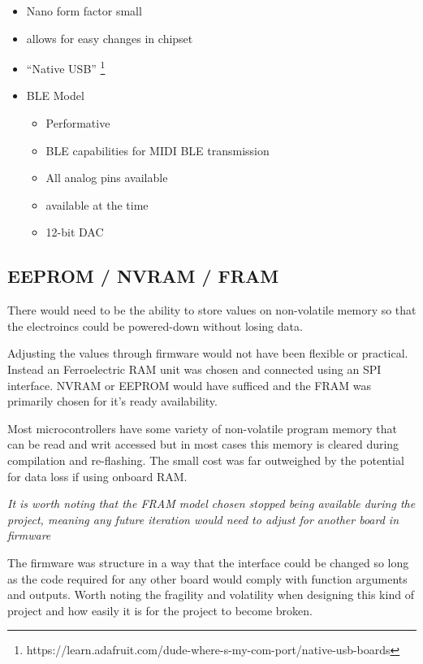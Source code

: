 \begin{itemize}
\item
  Nano form factor small
\item
  allows for easy changes in chipset
\item
  ``Native USB''
  \footnote{https://learn.adafruit.com/dude-where-s-my-com-port/native-usb-boards}
\item
  BLE Model

  \begin{itemize}
  \item
    Performative
  \item
    BLE capabilities for MIDI BLE transmission
  \item
    All analog pins available
  \item
    available at the time
  \item
    12-bit DAC
  \end{itemize}
\end{itemize}

\subsection{EEPROM / NVRAM / FRAM}\label{eeprom-nvram-fram}

There would need to be the ability to store values on non-volatile
memory so that the electroincs could be powered-down without losing
data.

Adjusting the values through firmware would not have been flexible or
practical. Instead an Ferroelectric RAM unit was chosen and connected
using an SPI interface. NVRAM or EEPROM would have sufficed and the FRAM
was primarily chosen for it's ready availability.

Most microcontrollers have some variety of non-volatile program memory
that can be read and writ accessed but in most cases this memory is
cleared during compilation and re-flashing. The small cost was far
outweighed by the potential for data loss if using onboard RAM.

\emph{It is worth noting that the FRAM model chosen stopped being
available during the project, meaning any future iteration would need to
adjust for another board in firmware}

The firmware was structure in a way that the interface could be changed
so long as the code required for any other board would comply with
function arguments and outputs. Worth noting the fragility and
volatility when designing this kind of project and how easily it is for
the project to become broken.

